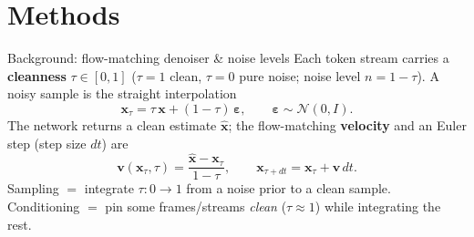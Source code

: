 \documentclass[aspectratio=169]{beamer}
\begin{document}
\section{Methods}
\begin{frame}{Background: flow-matching denoiser \& noise levels}
  Each token stream carries a \textbf{cleanness} $\tau\in[0,1]$
  ($\tau=1$ clean, $\tau=0$ pure noise; noise level $n=1-\tau$). A noisy
  sample is the straight interpolation
  \[
    \bm{x}_\tau = \tau\,\bm{x} + (1-\tau)\,\bm\varepsilon,
    \qquad \bm\varepsilon\sim\mathcal N(0,I).
  \]
  The network returns a clean estimate $\hat{\bm x}$; the flow-matching
  \textbf{velocity} and an Euler step (step size $dt$) are
  \[
    \bm v(\bm x_\tau,\tau)=\frac{\hat{\bm x}-\bm x_\tau}{1-\tau},
    \qquad
    \bm x_{\tau+dt} = \bm x_\tau + \bm v\,dt .
  \]
  Sampling $=$ integrate $\tau:0\!\to\!1$ from a noise prior to a clean sample.
  Conditioning $=$ pin some frames/streams \emph{clean} ($\tau\approx1$) while
  integrating the rest.
\end{frame}
\end{document}
